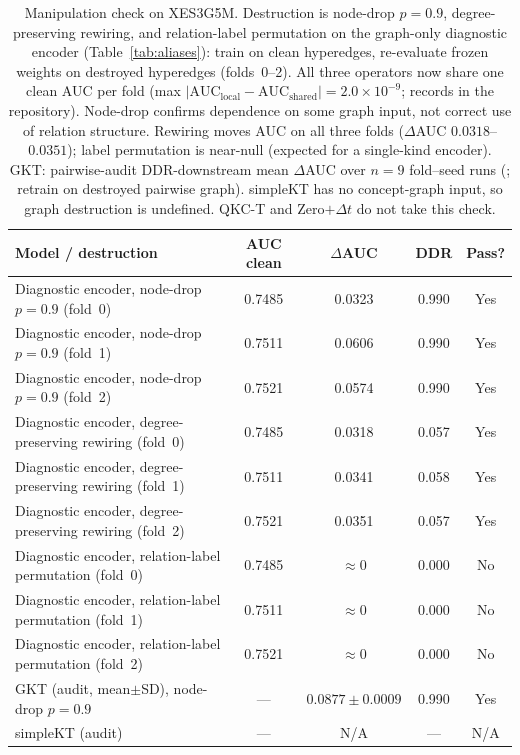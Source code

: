 \begin{table}[H]
\caption{Manipulation check on XES3G5M. Destruction is node-drop
$p{=}0.9$, degree-preserving rewiring, and relation-label permutation on
the graph-only diagnostic encoder (Table~\ref{tab:aliases}): train on clean
hyperedges, re-evaluate frozen weights on destroyed hyperedges
(folds~0--2). All three operators now share one clean AUC per fold
(max $|\mathrm{AUC}_{\mathrm{local}}-\mathrm{AUC}_{\mathrm{shared}}|{=}2.0{\times}10^{-9}$;
records in the repository).
Node-drop confirms dependence on some
graph input, not correct use of relation structure.
Rewiring moves AUC on all three folds
($\Delta$AUC $0.0318$--$0.0351$); label permutation is near-null (expected for a
single-kind encoder). GKT: pairwise-audit DDR-downstream mean $\Delta$AUC over
$n{=}9$ fold--seed runs (\cite{daominh2026p0}; retrain on destroyed
pairwise graph). simpleKT has no concept-graph input, so graph
destruction is undefined. QKC-T and Zero$+\Delta t$ do not take
this check.}
\label{tab:manipulation}
\centering
\scriptsize
\setlength{\tabcolsep}{3pt}
\begin{tabularx}{\textwidth}{@{}Xcccc@{}}
\toprule
Model / destruction & AUC clean & $\Delta$AUC & DDR & Pass? \\
\midrule
Diagnostic encoder, node-drop $p{=}0.9$ (fold~0) & 0.7485 & 0.0323 & 0.990 & Yes \\
Diagnostic encoder, node-drop $p{=}0.9$ (fold~1) & 0.7511 & 0.0606 & 0.990 & Yes \\
Diagnostic encoder, node-drop $p{=}0.9$ (fold~2) & 0.7521 & 0.0574 & 0.990 & Yes \\
Diagnostic encoder, degree-preserving rewiring (fold~0) & 0.7485 & 0.0318 & 0.057 & Yes \\
Diagnostic encoder, degree-preserving rewiring (fold~1) & 0.7511 & 0.0341 & 0.058 & Yes \\
Diagnostic encoder, degree-preserving rewiring (fold~2) & 0.7521 & 0.0351 & 0.057 & Yes \\
Diagnostic encoder, relation-label permutation (fold~0) & 0.7485 & ${\approx}0$ & 0.000 & No \\
Diagnostic encoder, relation-label permutation (fold~1) & 0.7511 & ${\approx}0$ & 0.000 & No \\
Diagnostic encoder, relation-label permutation (fold~2) & 0.7521 & ${\approx}0$ & 0.000 & No \\
GKT (audit, mean$\pm$SD), node-drop $p{=}0.9$ & --- & $0.0877{\pm}0.0009$ & 0.990 & Yes \\
simpleKT (audit) & --- & N/A & --- & N/A \\
\bottomrule
\end{tabularx}
\end{table}
